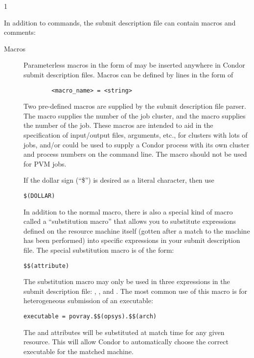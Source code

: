 \begin{ManPage}{\label{man-condor-submit}}{1}
\begin{description}

\end{description}

In addition to commands, the submit description file can contain macros
and comments:

\begin{description}

\item[Macros] Parameterless macros in the form of 
may be inserted anywhere in Condor submit description files. Macros can be
defined by lines in the form of 
\begin{verbatim} 
        <macro_name> = <string> 
\end{verbatim} 
Two pre-defined macros are supplied by the submit description file parser.
The
 macro supplies the number of the job cluster, and the
 macro supplies the number of the job. These macros are
intended to aid in the specification of input/output files, arguments,
etc., for clusters with lots of jobs, and/or could be used to supply a
Condor process with its own cluster and process numbers on the command
line.  The  macro should not be used for PVM jobs.

If the dollar sign (``\$'') is desired as a literal character,
then use
\begin{verbatim}
$(DOLLAR)
\end{verbatim}

In addition to the normal macro, there is also a special kind of macro
called a ``substitution macro'' that allows you to substitute
expressions defined on the resource machine itself (gotten after a match
to the machine has been performed) into specific expressions in your
submit description file. The special substitution macro is of the form:
\begin{verbatim} 
$$(attribute)
\end{verbatim}

The substitution macro may only be used in three expressions in the
submit description file: , , and
. The most common use of this macro is for heterogeneous
submission of an executable:
\begin{verbatim}
executable = povray.$$(opsys).$$(arch)
\end{verbatim}
The  and  attributes will be substituted at
match time for any given resource. This will allow Condor to automatically
choose the correct executable for the matched machine.



\end{description}
\end{ManPage}
